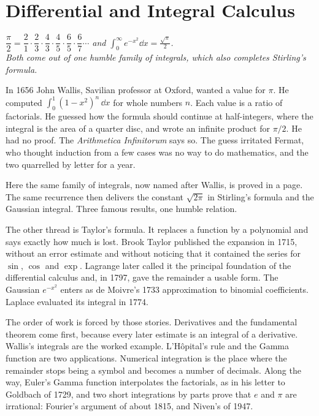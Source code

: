 \chapter{Differential and Integral Calculus}\label{ch:calculus}

\begin{center}\itshape
$\dfrac\pi2=\dfrac21\cdot\dfrac23\cdot\dfrac43\cdot\dfrac45\cdot\dfrac65\cdot\dfrac67\cdots$ \quad and \quad $\displaystyle\int_0^\infty e^{-x^2}\dd x=\frac{\sqrt\pi}2$.\\
Both come out of one humble family of integrals, which also completes Stirling's formula.
\end{center}

In 1656 John Wallis, Savilian professor at Oxford, wanted a value for $\pi$. He computed $\int_0^1(1-x^2)^n\,\dd x$ for whole numbers $n$. Each value is a ratio of factorials. He guessed how the formula should continue at half-integers, where the integral is the area of a quarter disc, and wrote an infinite product for $\pi/2$. He had no proof. The \emph{Arithmetica Infinitorum} says so. The guess irritated Fermat, who thought induction from a few cases was no way to do mathematics, and the two quarrelled by letter for a year.

Here the same family of integrals, now named after Wallis, is proved in a page. The same recurrence then delivers the constant $\sqrt{2\pi}$ in Stirling's formula and the Gaussian integral. Three famous results, one humble relation.

The other thread is Taylor's formula. It replaces a function by a polynomial and says exactly how much is lost. Brook Taylor published the expansion in 1715, without an error estimate and without noticing that it contained the series for $\sin$, $\cos$ and $\exp$. Lagrange later called it the principal foundation of the differential calculus and, in 1797, gave the remainder a usable form. The Gaussian $e^{-x^2}$ enters as de Moivre's 1733 approximation to binomial coefficients. Laplace evaluated its integral in 1774.

The order of work is forced by those stories. Derivatives and the fundamental theorem come first, because every later estimate is an integral of a derivative. Wallis's integrals are the worked example. L'Hôpital's rule and the Gamma function are two applications. Numerical integration is the place where the remainder stops being a symbol and becomes a number of decimals. Along the way, Euler's Gamma function interpolates the factorials, as in his letter to Goldbach of 1729, and two short integrations by parts prove that $e$ and $\pi$ are irrational: Fourier's argument of about 1815, and Niven's of 1947.

